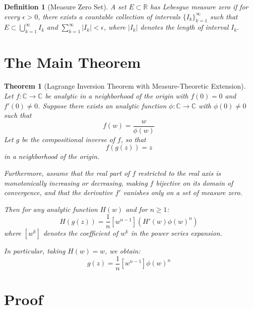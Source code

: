 \documentclass{article}
\newtheorem{definition}{Definition}
\newtheorem{theorem}{Theorem}
\begin{document}
\begin{definition}
  [Measure Zero Set] A set $E \subset \mathbb{R}$ has Lebesgue measure zero if
  for every $\epsilon > 0$, there exists a countable collection of intervals
  $\{I_k \}_{k = 1}^{\infty}$ such that $E \subset \bigcup_{k = 1}^{\infty}
  I_k$ and $\sum_{k = 1}^{\infty} |I_k | < \epsilon$, where $|I_k |$ denotes
  the length of interval $I_k$.
\end{definition}

\section{The Main Theorem}

\begin{theorem}
  [Lagrange Inversion Theorem with Measure-Theoretic Extension] Let $f :
  \mathbb{C} \to \mathbb{C}$ be analytic in a neighborhood of the origin with
  $f (0) = 0$ and $f' (0) \neq 0$. Suppose there exists an analytic function
  $\phi : \mathbb{C} \to \mathbb{C}$ with $\phi (0) \neq 0$ such that
  \begin{equation}
    f (w) = \frac{w}{\phi (w)}
  \end{equation}
  Let $g$ be the compositional inverse of $f$, so that
  \begin{equation}
    f (g (z)) = z
  \end{equation}
  in a neighborhood of the origin.
  
  Furthermore, assume that the real part of $f$ restricted to the real axis is
  monotonically increasing or decreasing, making $f$ bijective on its domain
  of convergence, and that the derivative $f'$ vanishes only on a set of
  measure zero.
  
  Then for any analytic function $H (w)$ and for $n \geq 1$:
  \begin{equation}
    [z^n] H (g (z)) = \frac{1}{n} [w^{n - 1}]  (H' (w) \phi (w)^n)
  \end{equation}
  where $[w^k]$ denotes the coefficient of $w^k$ in the power series
  expansion.
  
  In particular, taking $H (w) = w$, we obtain:
  \begin{equation}
    [z^n] g (z) = \frac{1}{n} [w^{n - 1}] \phi (w)^n
  \end{equation}
\end{theorem}

\section{Proof}
\end{document}
